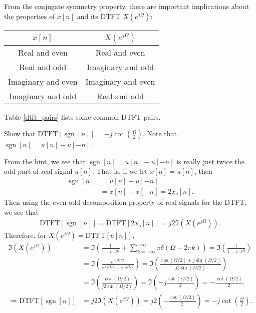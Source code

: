 \documentclass{report}
\begin{document}
From the conjugate symmetry property, there are important implications about the properties of $x[n]$ and its DTFT $X(e^{j\Omega})$:
\begin{center}
    \begin{tabular}{|c|c|}
        \hline
        $x[n]$ & $X(e^{j\Omega})$ \\
        \hline
        Real and even & Real and even \\
        Real and odd & Imaginary and odd \\
        Imaginary and even & Imaginary and even \\
        Imaginary and odd & Real and odd \\
        \hline
    \end{tabular}
\end{center}
Table \ref{dtft_pairs} lists some common DTFT pairs.

\begin{example}
    Show that $\text{DTFT}[\operatorname{sgn}[n]]=-j\cot\left(\frac{\Omega}{2}\right)$. 
    Note that $\operatorname{sgn}[n] = u[n]-u[-n]$.
\end{example}
\begin{solution}
    From the hint, we see that $\operatorname{sgn}[n] = u[n]-u[-n]$ is really just twice the odd part of real signal $u[n]$. 
    That is, if we let $x[n]=u[n]$, then
    \begin{align*}
        \operatorname{sgn}[n] &= u[n]-u[-n] \\ 
        &= x[n]-x[-n] = 2x_o[n].
    \end{align*}
    Then using the even-odd decomposition property of real signals for the DTFT, we see that 
    \begin{align*}
        \text{DTFT}[\operatorname{sgn}[n]] = \text{DTFT}[2x_o[n]] = j2\Im(X(e^{j\Omega})).
    \end{align*} 
    Therefore, for $X(e^{j\Omega})=\text{DTFT}[u[n]]$, 
    \begin{align*}
        \Im(X(e^{j\Omega})) &= \Im\left(\frac{1}{1-e^{-j\Omega}} + \sum_{k=-\infty}^{+\infty}\pi\delta(\Omega-2\pi k)\right) = \Im\left(\frac{1}{1-e^{-j\Omega}}\right) \\
        &= \Im\left(\frac{e^{+j\Omega/2}}{e^{+j\Omega/2}-e^{-j\Omega/2}}\right) = \Im\left(\frac{\cos(\Omega/2)+j\sin(\Omega/2)}{j2\sin(\Omega/2)}\right) \\
        &= \Im\left(\frac{\cos(\Omega/2)}{j2\sin(\Omega/2)}\right) = \Im\left(-j\frac{\cot(\Omega/2)}{2}\right) = -\frac{\cot(\Omega/2)}{2}. \\
        \Longrightarrow\text{DTFT}[\operatorname{sgn}[n]] &= j2\Im(X(e^{j\Omega})) = j2\left(-\frac{\cot(\Omega/2)}{2}\right) = -j\cot\left(\frac{\Omega}{2}\right).
    \end{align*}
\end{solution}
\end{document}
